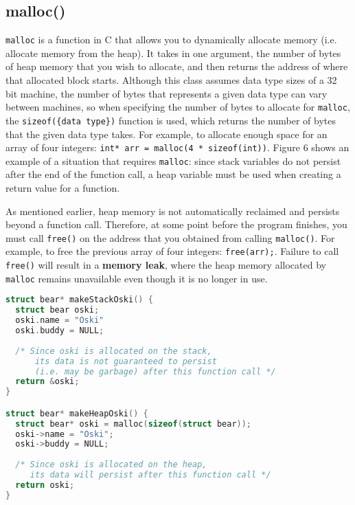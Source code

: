\documentclass{article}
\begin{document}
\subsection{malloc()}
\texttt{malloc} is a function in C that allows you to dynamically allocate memory (i.e. allocate memory from the heap). It takes in one argument, the number of bytes of heap memory that you wish to allocate, and then returns the address of where that allocated block starts. Although this class assumes data type sizes of a 32 bit machine, the number of bytes that represents a given data type can vary between machines, so when specifying the number of bytes to allocate for \texttt{malloc}, the \texttt{sizeof(\{data type\})} function is used, which returns the number of bytes that the given data type takes. For example, to allocate enough space for an array of four integers: \texttt{int* arr = malloc(4 * sizeof(int))}. Figure 6 shows an example of a situation that requires \texttt{malloc}: since stack variables do not persist after the end of the function call, a heap variable must be used when creating a return value for a function. 

As mentioned earlier, heap memory is not automatically reclaimed and persists beyond a function call. Therefore, at some point before the program finishes, you must call \texttt{free()} on the address that you obtained from calling \texttt{malloc()}. For example, to free the previous array of four integers: \texttt{free(arr);}. Failure to call \texttt{free()} will result in a \textbf{memory leak}, where the heap memory allocated by \texttt{malloc} remains unavailable even though it is no longer in use.
\begin{center}
\renewcommand{\ttdefault}{pcr}
\begin{lstlisting}[language=C, basicstyle=\ttfamily,  keywordstyle=\bfseries, showstringspaces=false]
struct bear* makeStackOski() {
  struct bear oski;
  oski.name = "Oski"
  oski.buddy = NULL;
  
  /* Since oski is allocated on the stack, 
      its data is not guaranteed to persist 
      (i.e. may be garbage) after this function call */
  return &oski; 
}

struct bear* makeHeapOski() {
  struct bear* oski = malloc(sizeof(struct bear));
  oski->name = "Oski";
  oski->buddy = NULL;
  
  /* Since oski is allocated on the heap,
     its data will persist after this function call */
  return oski;
}
\end{lstlisting}
\end{center}
\end{document}
